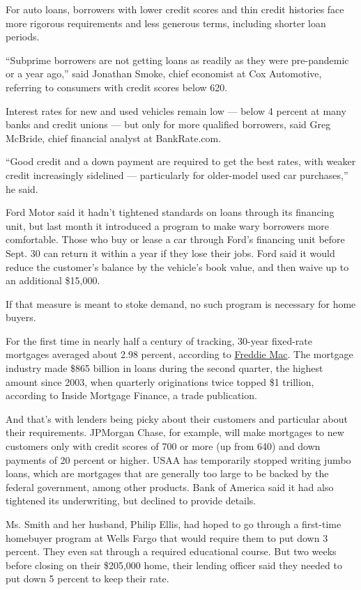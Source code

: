 For auto loans, borrowers with lower credit scores and thin credit
histories face more rigorous requirements and less generous terms,
including shorter loan periods.

``Subprime borrowers are not getting loans as readily as they were
pre-pandemic or a year ago,'' said Jonathan Smoke, chief economist at
Cox Automotive, referring to consumers with credit scores below 620.

Interest rates for new and used vehicles remain low --- below 4 percent
at many banks and credit unions --- but only for more qualified
borrowers, said Greg McBride, chief financial analyst at BankRate.com.

``Good credit and a down payment are required to get the best rates,
with weaker credit increasingly sidelined --- particularly for
older-model used car purchases,'' he said.

Ford Motor said it hadn't tightened standards on loans through its
financing unit, but last month it introduced a program to make wary
borrowers more comfortable. Those who buy or lease a car through Ford's
financing unit before Sept. 30 can return it within a year if they lose
their jobs. Ford said it would reduce the customer's balance by the
vehicle's book value, and then waive up to an additional \$15,000.

If that measure is meant to stoke demand, no such program is necessary
for home buyers.

For the first time in nearly half a century of tracking, 30-year
fixed-rate mortgages averaged about 2.98 percent, according to
\href{https://freddiemac.gcs-web.com/news-releases/news-release-details/mortgage-rates-fall-below-three-percent}{Freddie
Mac}. The mortgage industry made \$865 billion in loans during the
second quarter, the highest amount since 2003, when quarterly
originations twice topped \$1 trillion, according to Inside Mortgage
Finance, a trade publication.

And that's with lenders being picky about their customers and particular
about their requirements. JPMorgan Chase, for example, will make
mortgages to new customers only with credit scores of 700 or more (up
from 640) and down payments of 20 percent or higher. USAA has
temporarily stopped writing jumbo loans, which are mortgages that are
generally too large to be backed by the federal government, among other
products. Bank of America said it had also tightened its underwriting,
but declined to provide details.

Ms. Smith and her husband, Philip Ellis, had hoped to go through a
first-time homebuyer program at Wells Fargo that would require them to
put down 3 percent. They even sat through a required educational course.
But two weeks before closing on their \$205,000 home, their lending
officer said they needed to put down 5 percent to keep their rate.

